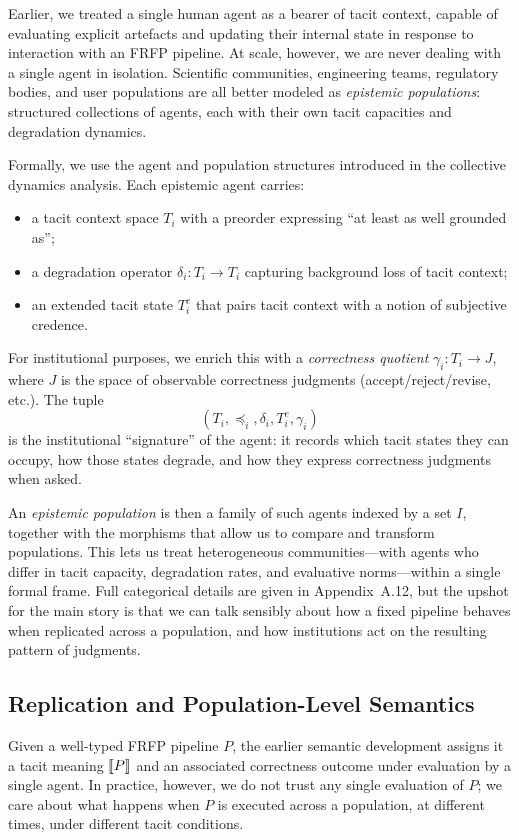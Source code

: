 Earlier, we treated a single human agent as a bearer of tacit context, capable of evaluating explicit artefacts and updating their internal state in response to interaction with an FRFP pipeline. At scale, however, we are never dealing with a single agent in isolation. Scientific communities, engineering teams, regulatory bodies, and user populations are all better modeled as \emph{epistemic populations}: structured collections of agents, each with their own tacit capacities and degradation dynamics.

Formally, we use the agent and population structures introduced in the collective dynamics analysis. Each epistemic agent carries:
\begin{itemize}
  \item a tacit context space $T_i$ with a preorder expressing ``at least as well grounded as'';
  \item a degradation operator $\delta_i : T_i \to T_i$ capturing background loss of tacit context;
  \item an extended tacit state $T^e_i$ that pairs tacit context with a notion of subjective credence.
\end{itemize}
For institutional purposes, we enrich this with a \emph{correctness quotient} $\gamma_i : T_i \to J$, where $J$ is the space of observable correctness judgments (accept/reject/revise, etc.). The tuple
\[
  (T_i, \preceq_i, \delta_i, T^e_i, \gamma_i)
\]
is the institutional ``signature'' of the agent: it records which tacit states they can occupy, how those states degrade, and how they express correctness judgments when asked.

An \emph{epistemic population} is then a family of such agents indexed by a set $I$, together with the morphisms that allow us to compare and transform populations. This lets us treat heterogeneous communities---with agents who differ in tacit capacity, degradation rates, and evaluative norms---within a single formal frame. Full categorical details are given in Appendix~A.12, but the upshot for the main story is that we can talk sensibly about how a fixed pipeline behaves when replicated across a population, and how institutions act on the resulting pattern of judgments.

\subsection{Replication and Population-Level Semantics}

Given a well-typed FRFP pipeline $P$, the earlier semantic development assigns it a tacit meaning $\llbracket P \rrbracket$ and an associated correctness outcome under evaluation by a single agent. In practice, however, we do not trust any single evaluation of $P$; we care about what happens when $P$ is executed across a population, at different times, under different tacit conditions.

